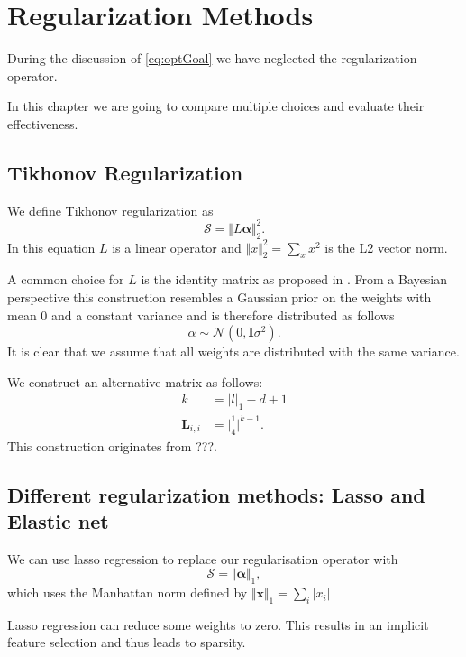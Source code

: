 \chapter{Regularization Methods}
During the discussion of \autoref{eq:optGoal} we have neglected the regularization
operator.

In this chapter we are going to compare multiple choices and evaluate their effectiveness.

\section{Tikhonov Regularization}
We define Tikhonov regularization as 
\begin{equation}
\mathcal{S} = \Vert L\bm{\alpha} \Vert_2^2.
\end{equation}
In this equation \(L\) is a linear operator
and \(\Vert x \Vert_2^2 = \sum_x x^2\) is the L2 vector norm.

A common choice for \(L\) is the identity matrix as proposed in \cite{SpatAdaptGrid}.
From a Bayesian perspective this construction resembles a Gaussian prior on the weights with mean 0 and
a constant variance and is therefore distributed as follows
\begin{equation}
\alpha \sim \mathcal{N} (0, \bm{I} \sigma^2 ).
\end{equation}
It is clear that we assume that all weights are distributed with the same variance. 

We construct an alternative matrix as follows:
\begin{align}
  \label{eq:diagonalMatrix}
k & = \vert l \vert_1 - d + 1 \\
\bm{L}_{i,i} & = \vert ^1_4\vert^{k-1}.
\end{align}
This construction originates from ???.

\section{Different regularization methods: Lasso and Elastic net}
We can use lasso regression to replace our regularisation operator with 
\begin{equation}
\mathcal{S} = \Vert \bm{\alpha} \Vert_1,
\end{equation}
which uses the Manhattan norm defined by \(\Vert \bm{x} \Vert_1 = \sum_i \vert x_i \vert\)

Lasso regression can reduce some weights to zero. 
This results in an implicit feature selection and thus leads to sparsity.

